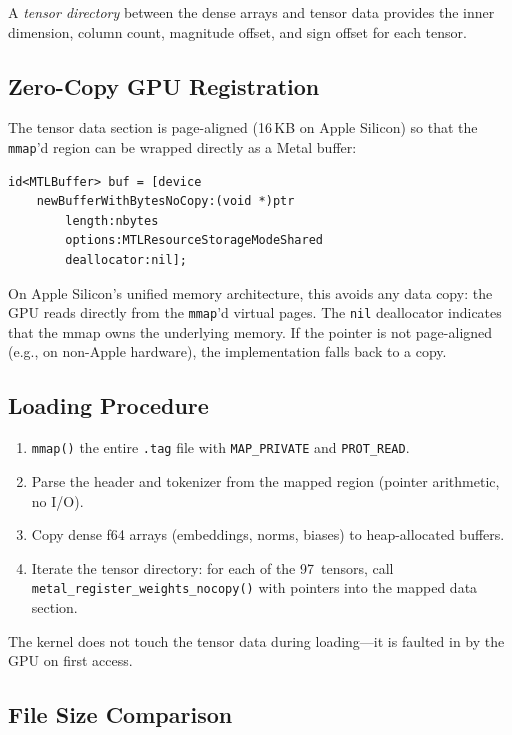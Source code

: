 \documentclass[acmsmall,nonacm]{acmart}
\begin{document}
A \emph{tensor directory} between the dense arrays and tensor data
provides the inner dimension, column count, magnitude offset, and
sign offset for each tensor.

\subsection{Zero-Copy GPU Registration}

The tensor data section is page-aligned (16\,KB on Apple Silicon)
so that the \texttt{mmap}'d region can be wrapped directly as a
Metal buffer:

\begin{lstlisting}[language=C89,caption={Zero-copy Metal buffer from mmap}]
id<MTLBuffer> buf = [device
    newBufferWithBytesNoCopy:(void *)ptr
        length:nbytes
        options:MTLResourceStorageModeShared
        deallocator:nil];
\end{lstlisting}

On Apple Silicon's unified memory architecture, this avoids any data
copy: the GPU reads directly from the \texttt{mmap}'d virtual pages.
The \texttt{nil} deallocator indicates that the mmap owns the
underlying memory.  If the pointer is not page-aligned (e.g., on
non-Apple hardware), the implementation falls back to a copy.

\subsection{Loading Procedure}

\begin{enumerate}
\item \texttt{mmap()} the entire \texttt{.tag} file with
  \texttt{MAP\_PRIVATE} and \texttt{PROT\_READ}.
\item Parse the header and tokenizer from the mapped region
  (pointer arithmetic, no I/O).
\item Copy dense f64 arrays (embeddings, norms, biases) to
  heap-allocated buffers.
\item Iterate the tensor directory: for each of the 97~tensors,
  call \texttt{metal\_register\_weights\_nocopy()} with pointers
  into the mapped data section.
\end{enumerate}

The kernel does not touch the tensor data during loading---it
is faulted in by the GPU on first access.

\subsection{File Size Comparison}
\end{document}
